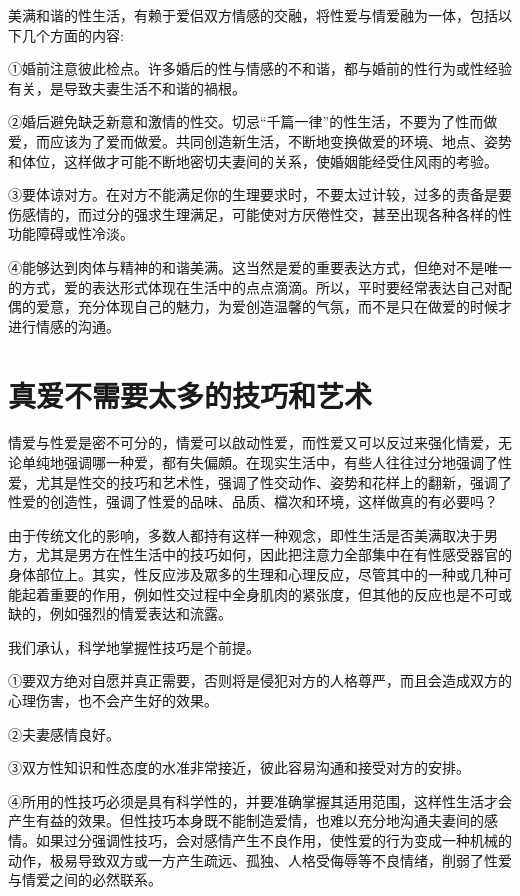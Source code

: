 \documentclass[12pt,UTF8]{ctexbook}
\begin{document}
美满和谐的性生活，有赖于爱侣双方情感的交融，将性爱与情爱融为一体，包括以下几个方面的内容:

①婚前注意彼此检点。许多婚后的性与情感的不和谐，都与婚前的性行为或性经验有关，是导致夫妻生活不和谐的禍根。

②婚后避免缺乏新意和激情的性交。切忌“千篇一律”的性生活，不要为了性而做爱，而应该为了爱而做爱。共同创造新生活，不断地变换做爱的环境、地点、姿势和体位，这样做才可能不断地密切夫妻间的关系，使婚姻能经受住风雨的考验。

③要体谅对方。在对方不能满足你的生理要求时，不要太过计较，过多的责备是要伤感情的，而过分的强求生理满足，可能使对方厌倦性交，甚至出现各种各样的性功能障碍或性冷淡。

④能够达到肉体与精神的和谐美满。这当然是爱的重要表达方式，但绝对不是唯一的方式，爱的表达形式体现在生活中的点点滴滴。所以，平时要经常表达自己对配偶的爱意，充分体现自己的魅力，为爱创造温馨的气氛，而不是只在做爱的时候才进行情感的沟通。

\section{真爱不需要太多的技巧和艺术}

情爱与性爱是密不可分的，情爱可以啟动性爱，而性爱又可以反过来强化情爱，无论单纯地强调哪一种爱，都有失偏頗。在现实生活中，有些人往往过分地强调了性爱，尤其是性交的技巧和艺术性，强调了性交动作、姿势和花样上的翻新，强调了性爱的创造性，强调了性爱的品味、品质、檔次和环境，这样做真的有必要吗？

由于传统文化的影响，多数人都持有这样一种观念，即性生活是否美满取决于男方，尤其是男方在性生活中的技巧如何，因此把注意力全部集中在有性感受器官的身体部位上。其实，性反应涉及眾多的生理和心理反应，尽管其中的一种或几种可能起着重要的作用，例如性交过程中全身肌肉的紧张度，但其他的反应也是不可或缺的，例如强烈的情爱表达和流露。

我们承认，科学地掌握性技巧是个前提。

①要双方绝对自愿并真正需要，否则将是侵犯对方的人格尊严，而且会造成双方的心理伤害，也不会产生好的效果。

②夫妻感情良好。

③双方性知识和性态度的水准非常接近，彼此容易沟通和接受对方的安排。

④所用的性技巧必须是具有科学性的，并要准确掌握其适用范围，这样性生活才会产生有益的效果。但性技巧本身既不能制造爱情，也难以充分地沟通夫妻间的感情。如果过分强调性技巧，会对感情产生不良作用，使性爱的行为变成一种机械的动作，极易导致双方或一方产生疏远、孤独、人格受侮辱等不良情绪，削弱了性爱与情爱之间的必然联系。
\end{document}
